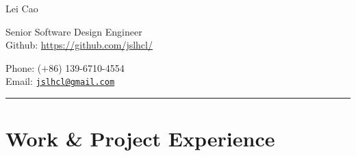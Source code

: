 \documentclass[letterpaper]{article}
\def\name{Lei Cao}
\begin{document}
{\huge \name}


\vspace{0.1in}
\begin{minipage}{0.55\linewidth}
  Senior Software Design Engineer \\
  Github: \url{https://github.com/jslhcl/} 
\end{minipage}
\vspace{0.1in}
\begin{minipage}{0.40\linewidth}
  Phone: ($+$86) 139-6710-4554 \\
  Email: \href{mailto:jslhcl@gmail.com}{\tt jslhcl@gmail.com} \\
\end{minipage}

\rule{16.8cm}{0.1em}

\vspace{-1em}
\section*{Work \& Project Experience}
\end{document}
